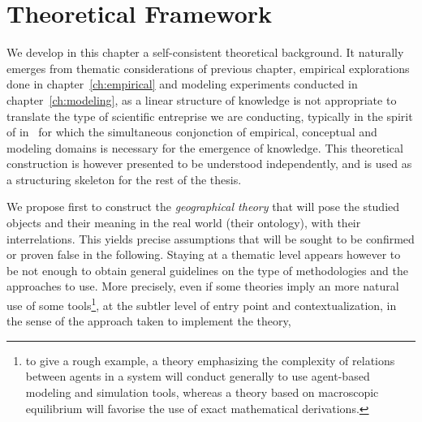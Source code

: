 



\chapter{Theoretical Framework} %

\label{ch:theory} %








We develop in this chapter a self-consistent theoretical background. It naturally emerges from thematic considerations of previous chapter, empirical explorations done in chapter~\ref{ch:empirical} and modeling experiments conducted in chapter~\ref{ch:modeling}, as a linear structure of knowledge is not appropriate to translate the type of scientific entreprise we are conducting, typically in the spirit of  in~\cite{}%
 for which the simultaneous conjonction of empirical, conceptual and modeling domains is necessary for the emergence of knowledge. This theoretical construction is however presented to be understood independently, and is used as a structuring skeleton for the rest of the thesis.

We propose first to construct the \emph{geographical theory} that will pose the studied objects and their meaning in the real world (their ontology), with their interrelations. This yields precise assumptions that will be sought to be confirmed or proven false in the following. Staying at a thematic level appears however to be not enough to obtain general guidelines on the type of methodologies and the approaches to use. More precisely, even if some theories imply an more natural use of some tools\footnote{to give a rough example, a theory emphasizing the complexity of relations between agents in a system will conduct generally to use agent-based modeling and simulation tools, whereas a theory based on macroscopic equilibrium will favorise the use of exact mathematical derivations.}, at the subtler level of entry point and contextualization, in the sense of the approach taken to implement the theory, 




